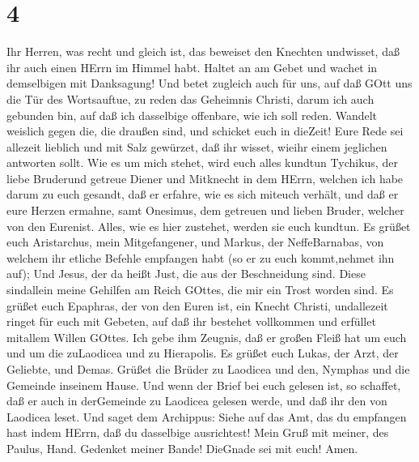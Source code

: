 \hypertarget{section-3}{%
\section{4}\label{section-3}}

 Ihr Herren, was recht und gleich ist, das beweiset den
Knechten undwisset, daß ihr auch einen HErrn im Himmel habt.
 Haltet an am Gebet und wachet in demselbigen mit
Danksagung!  Und betet zugleich auch für uns, auf daß GOtt
uns die Tür des Wortsauftue, zu reden das Geheimnis Christi, darum ich
auch gebunden bin,  auf daß ich dasselbige offenbare, wie
ich soll reden.  Wandelt weislich gegen die, die draußen
sind, und schicket euch in dieZeit!  Eure Rede sei allezeit
lieblich und mit Salz gewürzet, daß ihr wisset, wieihr einem jeglichen
antworten sollt.  Wie es um mich stehet, wird euch alles
kundtun Tychikus, der liebe Bruderund getreue Diener und Mitknecht in
dem HErrn,  welchen ich habe darum zu euch gesandt, daß er
erfahre, wie es sich miteuch verhält, und daß er eure Herzen ermahne,
 samt Onesimus, dem getreuen und lieben Bruder, welcher von
den Eurenist. Alles, wie es hier zustehet, werden sie euch kundtun.
 Es grüßet euch Aristarchus, mein Mitgefangener, und
Markus, der NeffeBarnabas, von welchem ihr etliche Befehle empfangen
habt (so er zu euch kommt,nehmet ihn auf);  Und Jesus, der
da heißt Just, die aus der Beschneidung sind. Diese sindallein meine
Gehilfen am Reich GOttes, die mir ein Trost worden sind. 
Es grüßet euch Epaphras, der von den Euren ist, ein Knecht Christi,
undallezeit ringet für euch mit Gebeten, auf daß ihr bestehet vollkommen
und erfüllet mitallem Willen GOttes.  Ich gebe ihm Zeugnis,
daß er großen Fleiß hat um euch und um die zuLaodicea und zu Hierapolis.
 Es grüßet euch Lukas, der Arzt, der Geliebte, und Demas.
 Grüßet die Brüder zu Laodicea und den, Nymphas und die
Gemeinde inseinem Hause.  Und wenn der Brief bei euch
gelesen ist, so schaffet, daß er auch in derGemeinde zu Laodicea gelesen
werde, und daß ihr den von Laodicea leset.  Und saget dem
Archippus: Siehe auf das Amt, das du empfangen hast indem HErrn, daß du
dasselbige ausrichtest!  Mein Gruß mit meiner, des Paulus,
Hand. Gedenket meiner Bande! DieGnade sei mit euch! Amen.

